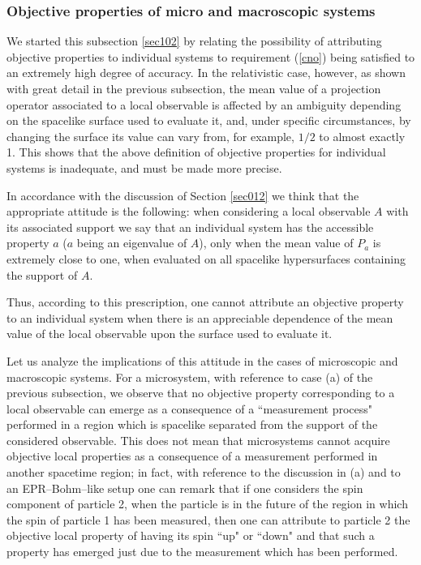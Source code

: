 \documentclass[10pt,a4paper]{article}
\begin{document}
\subsubsection{Objective properties of micro and macroscopic systems}
\label{sec1024}

We started this subsection \ref{sec102} by relating the
possibility of attributing objective properties to individual
systems to requirement (\ref{cno}) being satisfied to an extremely
high degree of accuracy. In the relativistic case, however, as
shown with great detail in the previous subsection, the mean value
of a projection operator associated to a local observable is
affected by an ambiguity depending on the spacelike surface used
to evaluate it, and, under specific circumstances, by changing the
surface its value can vary from, for example, $1/2$ to almost
exactly 1. This shows that the above definition of objective
properties for individual systems is inadequate, and must be made
more precise.

In accordance with the discussion of Section \ref{sec012} we think that
the appropriate attitude is the following: when considering a local
observable $A$ with its associated support we say that an individual
system has the accessible property $a$ ($a$ being an eigenvalue of $A$),
only when the mean value of $P_{a}$ is extremely close to one, when
evaluated on all spacelike hypersurfaces containing the support of $A$.

Thus, according to this prescription, one cannot attribute an
objective property to an individual system when there is an
appreciable dependence of the mean value of the local observable
upon the surface used to evaluate it.

Let us analyze the implications of this attitude in the cases of
microscopic and macroscopic systems. For a microsystem, with
reference to case (a) of the previous subsection, we observe that
no objective property corresponding to a local observable can
emerge as a consequence of a ``measurement process" performed in a
region which is spacelike separated from the support of the
considered observable. This does not mean that microsystems cannot
acquire objective local properties as a consequence of a
measurement performed in another spacetime region; in fact, with
reference to the discussion in (a) and to an EPR--Bohm--like setup
one can remark that if one considers the spin component of
particle 2, when the particle is in the future of the region in
which the spin of particle 1 has been measured, then one can
attribute to particle 2 the objective local property of having its
spin ``up" or ``down" and that such a property has emerged just
due to the measurement which has been performed.
\end{document}
